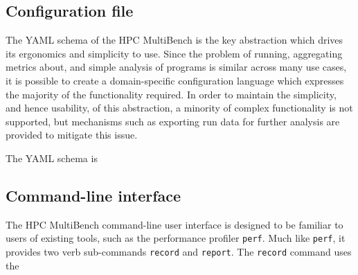 \subsection{Configuration file}
\label{sec:hpc-multibench-configuration-design}
The YAML schema of the HPC MultiBench is the key abstraction which drives its ergonomics and simplicity to use. Since the problem of running, aggregating metrics about, and simple analysis of programs is similar across many use cases, it is possible to create a domain-specific configuration language which expresses the majority of the functionality required. In order to maintain the simplicity, and hence usability, of this abstraction, a minority of complex functionality is not supported, but mechanisms such as exporting run data for further analysis are provided to mitigate this issue.

The YAML schema is 


\subsection{Command-line interface}
\label{sec:hpc-multibench-cli-design}

The HPC MultiBench command-line user interface is designed to be familiar to users of existing tools, such as the performance profiler \texttt{perf}. Much like \texttt{perf}, it provides two verb sub-commands \texttt{record} and \texttt{report}. The \texttt{record} command uses the 






